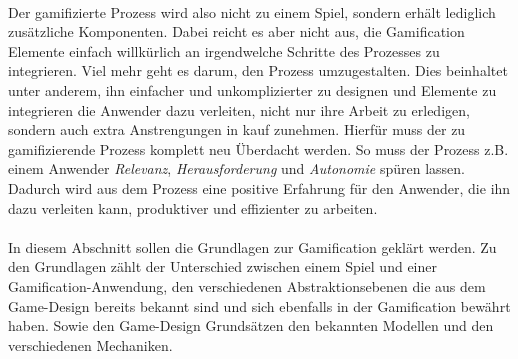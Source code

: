 \documentclass[a4paper,12pt]{scrartcl}
\begin{document}
\\
Der gamifizierte Prozess wird also nicht zu einem Spiel, sondern erhält lediglich zusätzliche Komponenten. Dabei reicht es aber nicht aus, die Gamification Elemente einfach willkürlich an irgendwelche Schritte des Prozesses zu integrieren. Viel mehr geht es darum, den Prozess umzugestalten. Dies beinhaltet unter anderem, ihn einfacher und unkomplizierter zu designen und Elemente zu integrieren die Anwender dazu verleiten, nicht nur ihre Arbeit zu erledigen, sondern auch extra Anstrengungen in kauf zunehmen. Hierfür muss der zu gamifizierende Prozess komplett neu Überdacht werden. So muss der Prozess z.B. einem Anwender \textit{Relevanz}, \textit{Herausforderung} und \textit{Autonomie} spüren lassen. Dadurch wird aus dem Prozess eine positive Erfahrung für den Anwender, die ihn dazu verleiten kann, produktiver und effizienter zu arbeiten.
\\\\
In diesem Abschnitt sollen die Grundlagen zur Gamification geklärt werden. Zu den Grundlagen zählt der Unterschied zwischen einem Spiel und einer Gamification-Anwendung, den verschiedenen Abstraktionsebenen die aus dem Game-Design bereits bekannt sind und sich ebenfalls in der Gamification bewährt haben. Sowie den Game-Design Grundsätzen den bekannten Modellen und den verschiedenen Mechaniken. 
\end{document}
